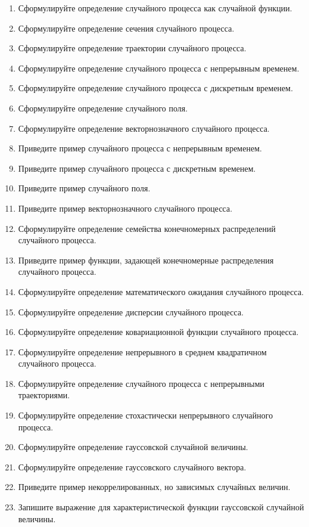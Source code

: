 \documentclass[a4paper,12pt]{extreport}
\renewcommand{\=}[1]{\stackrel{#1}{=}} %
\begin{document}
\begin{enumerate}
	\item Сформулируйте определение случайного процесса как случайной функции.
	\item Сформулируйте определение сечения случайного процесса.
	\item Сформулируйте определение траектории случайного процесса.

	\item Сформулируйте определение случайного процесса с непрерывным временем.
	\item Сформулируйте определение случайного процесса с дискретным временем.
	\item Сформулируйте определение случайного поля.
	\item Сформулируйте определение векторнозначного случайного процесса.

	\item Приведите пример случайного процесса с непрерывным временем.
	\item Приведите пример случайного процесса с дискретным временем.
	\item Приведите пример случайного поля.
	\item Приведите пример векторнозначного случайного процесса.

	\item Сформулируйте определение семейства конечномерных распределений случайного процесса.
	\item Приведите пример функции, задающей конечномерные распределения случайного процесса.

	\item Сформулируйте определение математического ожидания случайного процесса.
	\item Сформулируйте определение дисперсии случайного процесса.
	\item Сформулируйте определение ковариационной функции случайного процесса.
	
	\item Сформулируйте определение непрерывного в среднем квадратичном случайного процесса.
	\item Сформулируйте определение случайного процесса с непрерывными траекториями.
	\item Сформулируйте определение стохастически непрерывного случайного процесса.

	\item Сформулируйте определение гауссовской случайной величины.
	\item Сформулируйте определение гауссовского случайного вектора.
	\item Приведите пример некоррелированных, но зависимых случайных величин.
	\item Запишите выражение для характеристической функции гауссовской
	случайной величины.


\end{enumerate}
\end{document}
